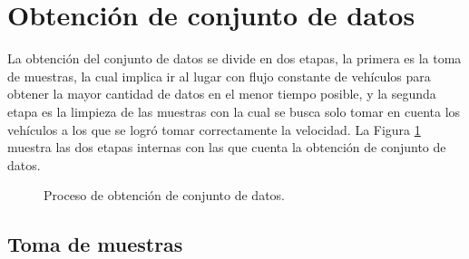 \section{Obtención de conjunto de datos}


La obtención del conjunto de datos se divide en dos etapas, la primera es la toma de muestras, la cual implica ir al lugar con flujo constante de vehículos para obtener la mayor cantidad de datos en el menor tiempo posible, y la segunda etapa es la limpieza de las muestras con la cual se busca solo tomar en cuenta los vehículos a los que se logró tomar correctamente la velocidad.
La Figura \ref{fig:DFCreacionCD} muestra las dos etapas internas con las que cuenta la obtención de conjunto de datos.

\begin{figure}[H]
    \centering

    \caption{Proceso de obtención de conjunto de datos.}
    \label{fig:DFCreacionCD}
\end{figure}



\subsection{Toma de muestras}


